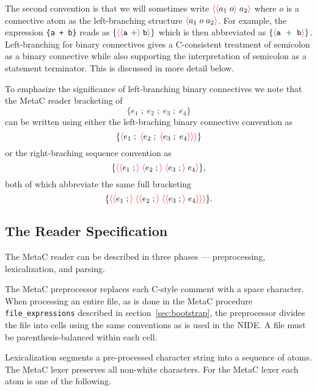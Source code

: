 \documentclass{article}
\newcommand{\mtt}[1]{\mbox{\tt #1}}
\newcommand{\fopen}{{\color{red} \langle}}
\newcommand{\fclose}{{\color{red} \rangle}}
\begin{document}
The second convention is that we will sometimes write $\fopen \fopen a_1 \;o\fclose\;a_2\fclose$ where $o$ is a connective atom
as the left-branching structure $\fopen a_1\;o\;a_2 \fclose$.  For example, the expression \mtt{\{a + b\}} reads as
$\{\fopen \fopen \mathtt{a~+} \fclose \;\mathtt{b} \fclose \}$ which is then abbreviated as
$\{\fopen \mathtt{a~+~b} \fclose \}$.  Left-branching for binary connectives gives a
C-consistent treatment of semicolon as a binary connective while also supporting the interpretation of semicolon as a statement terminator.
This is discussed in more detail below.

To emphasize the significance of left-branching binary connectives we note that
the MetaC reader bracketing of
$$\{e_1\;;\;e_2\;;\;e_3\;;\;e_4\}$$
can be written using either the left-braching binary connective convention as
$$\{\fopen e_1\;;\;\fopen e_2\;;\;\fopen e_3\;;\;e_4\fclose\fclose\fclose\}$$
or the right-braching sequence convention as
$$\{\fopen \fopen e_1\;;\fclose \;\fopen e_2\;;\fclose \;\fopen e_3\;;\fclose\;e_4\fclose\},$$
both of which abbreviate the same full bracketing
$$\{\fopen \fopen e_1\;;\fclose \;\fopen \fopen e_2\;;\fclose \;\fopen \fopen e_3\;;\fclose\;e_4\fclose\fclose\fclose\}.$$



\subsection{The Reader Specification}
\label{sec:reader}

The MetaC reader can be described in three phases --- preprocessing, lexicalization, and parsing.

The MetaC preprocessor replaces each C-style comment with a space character.  When processing an entire file,
as is done in the MetaC procedure {\tt file\_expressions}
described in section~\ref{sec:bootstrap}, the preprocessor divides the file into
cells using the same conventions as is used in the NIDE.
A file must be parenthesis-balanced within each cell.

Lexicalization segments a pre-processed character string into a sequence of atoms.
The MetaC lexer preserves all non-white characters.  For the MetaC lexer each atom is one of the following.
\end{document}
